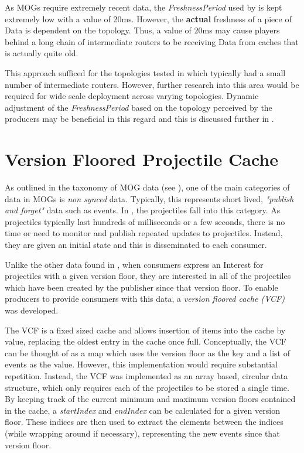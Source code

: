 As MOGs require extremely recent data, the \textit{FreshnessPeriod} used by \game{} is kept extremely low with a value of 20ms. However, the \textbf{actual} freshness of a piece of Data is dependent on the topology. Thus, a value of 20ms may cause players behind a long chain of intermediate routers to be receiving Data from caches that is actually quite old.

This approach sufficed for the topologies tested in  which typically had a small number of intermediate routers. However, further research into this area would be required for wide scale deployment across varying topologies. Dynamic adjustment of the \textit{FreshnessPeriod} based on the topology perceived by the producers may be beneficial in this regard and this is discussed further in .




\section{Version Floored Projectile Cache}
As outlined in the taxonomy of MOG data (see ), one of the main categories of data in MOGs is \textit{non synced} data. Typically, this represents short lived, \textit{"publish and forget"} data such as events. In \game{}, the projectiles fall into this category. As projectiles typically last hundreds of milliseconds or a few seconds, there is no time or need to monitor and publish repeated updates to projectiles. Instead, they are given an initial state and this is disseminated to each consumer. 

Unlike the other data found in \game{}, when consumers express an Interest for projectiles with a given version floor, they are interested in all of the projectiles which have been created by the publisher since that version floor. To enable producers to provide consumers with this data, a \textit{version floored cache (VCF)} was developed.

The VCF is a fixed sized cache and allows insertion of items into the cache by value, replacing the oldest entry in the cache once full. Conceptually, the VCF can be thought of as a map which uses the version floor as the key and a list of events as the value. However, this implementation would require substantial repetition. Instead, the VCF was implemented as an array based, circular data structure, which only requires each of the projectiles to be stored a single time. By keeping track of the current minimum and maximum version floors contained in the cache, a \textit{startIndex} and \textit{endIndex} can be calculated for a given version floor. These indices are then used to extract the elements between the indices (while wrapping around if necessary), representing the new events since that version floor. 

